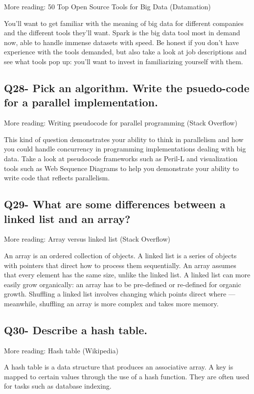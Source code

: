 \documentclass[11pt,a4paper]{article}
\begin{document}
More reading: 50 Top Open Source Tools for Big Data (Datamation)

You’ll want to get familiar with the meaning of big data for different companies and the different tools they’ll want. Spark is the big data tool most in demand now, able to handle immense datasets with speed. Be honest if you don’t have experience with the tools demanded, but also take a look at job descriptions and see what tools pop up: you’ll want to invest in familiarizing yourself with them.

\subsection{Q28- Pick an algorithm. Write the psuedo-code for a parallel implementation.}

More reading: Writing pseudocode for parallel programming (Stack Overflow)

This kind of question demonstrates your ability to think in parallelism and how you could handle concurrency in programming implementations dealing with big data. Take a look at pseudocode frameworks such as Peril-L and visualization tools such as Web Sequence Diagrams to help you demonstrate your ability to write code that reflects parallelism.

\subsection{Q29- What are some differences between a linked list and an array?}

More reading: Array versus linked list (Stack Overflow)

An array is an ordered collection of objects. A linked list is a series of objects with pointers that direct how to process them sequentially. An array assumes that every element has the same size, unlike the linked list. A linked list can more easily grow organically: an array has to be pre-defined or re-defined for organic growth. Shuffling a linked list involves changing which points direct where — meanwhile, shuffling an array is more complex and takes more memory.

\subsection{Q30- Describe a hash table.}

More reading: Hash table (Wikipedia)

A hash table is a data structure that produces an associative array. A key is mapped to certain values through the use of a hash function. They are often used for tasks such as database indexing.
\end{document}
